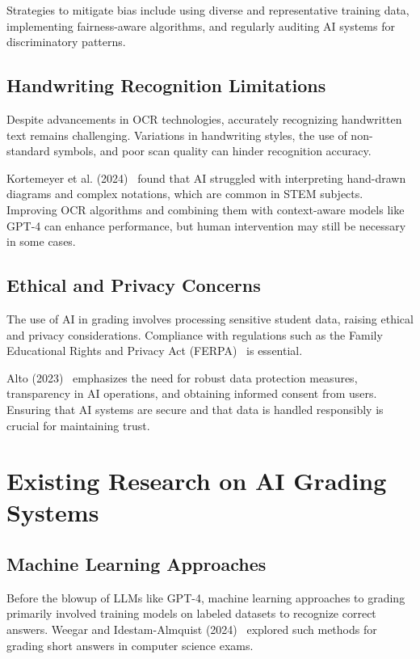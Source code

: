 \documentclass[ms,twoside,print]{nuthesis}
\begin{document}
Strategies to mitigate bias include using diverse and representative training data, implementing fairness-aware algorithms, and regularly auditing AI systems for discriminatory patterns.

\subsection{Handwriting Recognition Limitations}

Despite advancements in OCR technologies, accurately recognizing handwritten text remains challenging. Variations in handwriting styles, the use of non-standard symbols, and poor scan quality can hinder recognition accuracy. %

Kortemeyer et al. (2024)~\cite{Kortemeyer2024} found that AI struggled with interpreting hand-drawn diagrams and complex notations, which are common in STEM subjects. Improving OCR algorithms and combining them with context-aware models like GPT-4 can enhance performance, but human intervention may still be necessary in some cases. %

\subsection{Ethical and Privacy Concerns}

The use of AI in grading involves processing sensitive student data, raising ethical and privacy considerations. Compliance with regulations such as the Family Educational Rights and Privacy Act (FERPA)~\cite{CitationNeeded} is essential.

Alto (2023)~\cite{Alto2023} emphasizes the need for robust data protection measures, transparency in AI operations, and obtaining informed consent from users. Ensuring that AI systems are secure and that data is handled responsibly is crucial for maintaining trust.

\section{Existing Research on AI Grading Systems}

\subsection{Machine Learning Approaches}

Before the blowup of LLMs like GPT-4, machine learning approaches to grading primarily involved training models on labeled datasets to recognize correct answers. Weegar and Idestam-Almquist (2024)~\cite{RebeckaWeegar2024} explored such methods for grading short answers in computer science exams.
\end{document}
